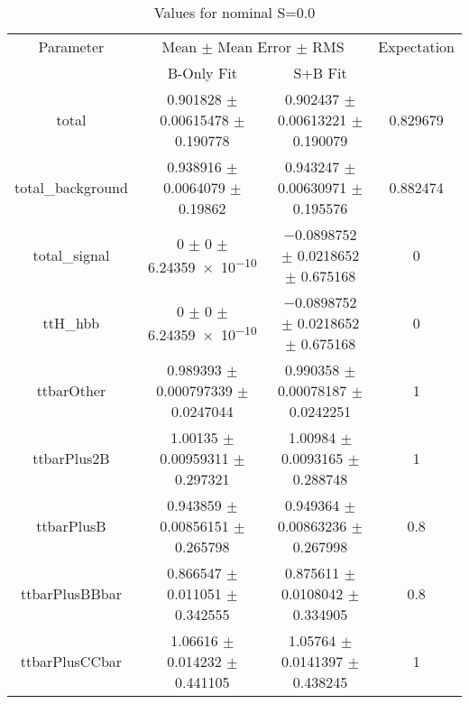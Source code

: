 \begin{table}
\centering
\caption{Values for nominal S=0.0}
\begin{tabular}{cccc}
\toprule
Parameter & \multicolumn{2}{c}{Mean $\pm$ Mean Error $\pm$ RMS} & Expectation\\
 & B-Only Fit & S+B Fit & \\
\midrule
total & \num{0.901828} $\pm$ \num{0.00615478} $\pm$ \num{0.190778} & \num{0.902437} $\pm$ \num{0.00613221} $\pm$ \num{0.190079} & \num{0.829679}\\
total\_background & \num{0.938916} $\pm$ \num{0.0064079} $\pm$ \num{0.19862} & \num{0.943247} $\pm$ \num{0.00630971} $\pm$ \num{0.195576} & \num{0.882474}\\
total\_signal & \num{0} $\pm$ \num{0} $\pm$ \num{6.24359e-10} & \num{-0.0898752} $\pm$ \num{0.0218652} $\pm$ \num{0.675168} & \num{0}\\
ttH\_hbb & \num{0} $\pm$ \num{0} $\pm$ \num{6.24359e-10} & \num{-0.0898752} $\pm$ \num{0.0218652} $\pm$ \num{0.675168} & \num{0}\\
ttbarOther & \num{0.989393} $\pm$ \num{0.000797339} $\pm$ \num{0.0247044} & \num{0.990358} $\pm$ \num{0.00078187} $\pm$ \num{0.0242251} & \num{1}\\
ttbarPlus2B & \num{1.00135} $\pm$ \num{0.00959311} $\pm$ \num{0.297321} & \num{1.00984} $\pm$ \num{0.0093165} $\pm$ \num{0.288748} & \num{1}\\
ttbarPlusB & \num{0.943859} $\pm$ \num{0.00856151} $\pm$ \num{0.265798} & \num{0.949364} $\pm$ \num{0.00863236} $\pm$ \num{0.267998} & \num{0.8}\\
ttbarPlusBBbar & \num{0.866547} $\pm$ \num{0.011051} $\pm$ \num{0.342555} & \num{0.875611} $\pm$ \num{0.0108042} $\pm$ \num{0.334905} & \num{0.8}\\
ttbarPlusCCbar & \num{1.06616} $\pm$ \num{0.014232} $\pm$ \num{0.441105} & \num{1.05764} $\pm$ \num{0.0141397} $\pm$ \num{0.438245} & \num{1}\\
\bottomrule
\end{tabular}
\end{table}